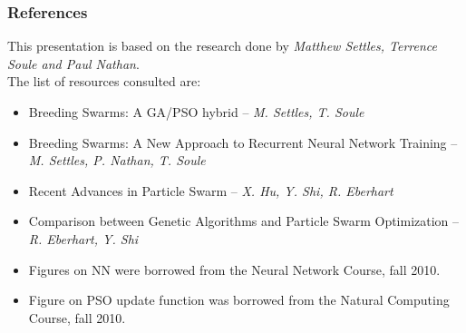 \documentclass{beamer}
\begin{document}
\begin{frame}
 \frametitle{References}
 This presentation is based on the research done by \emph{Matthew Settles, Terrence Soule \mbox{and} Paul Nathan}. \\
 \bigskip
 The list of resources consulted are:
 \begin{itemize}
  \item Breeding Swarms: A GA/PSO hybrid -- \emph{M. Settles, T. Soule}
  \item Breeding Swarms: A New Approach to Recurrent Neural Network Training -- \emph{M. Settles, P. Nathan, T. Soule}
  \item Recent Advances in Particle Swarm -- \emph{X. Hu, Y. Shi, R. Eberhart}
  \item Comparison between Genetic Algorithms and Particle Swarm Optimization -- \emph{R. Eberhart, Y. Shi}
  \item Figures on NN were borrowed from the Neural Network Course, fall 2010.
  \item Figure on PSO update function was borrowed from the Natural Computing Course, fall 2010.
 \end{itemize}

\end{frame}
\end{document}
